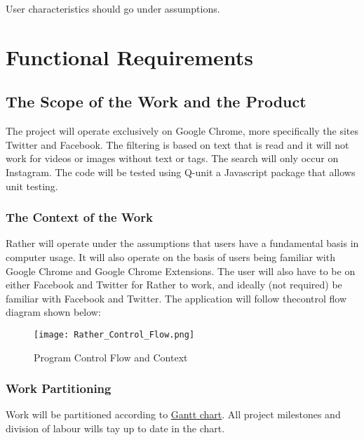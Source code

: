 \documentclass[12pt, titlepage]{article}
\begin{document}
User characteristics should go under assumptions.

\section{Functional Requirements}


\subsection{The Scope of the Work and the Product}
The project will operate exclusively on Google Chrome, more specifically the sites Twitter and Facebook. The filtering is based on text that is read and it will not work for videos or images without text or tags. The search will only occur on Instagram. The code will be tested using Q-unit a Javascript package that allows unit testing.

\subsubsection{The Context of the Work}
Rather will operate under the assumptions that users have a fundamental basis in computer usage. It will also operate on the basis of users being familiar with Google Chrome and Google Chrome Extensions. The user will also have to be on either Facebook and Twitter for Rather to work, and ideally (not required) be familiar with Facebook and Twitter. The application will follow thecontrol flow diagram shown below:
\begin{figure}
  \texttt{[image: Rather\_Control\_Flow.png]}
  \caption{Program Control Flow and Context}
  \label{fig:Control Flow Diagram}
\end{figure}


\subsubsection{Work Partitioning}
Work will be partitioned according to \href{../DevelopmentPlan/Dev_Plan_Rev0.gan}{Gantt chart}. All project milestones and division of labour wills tay up to date in the chart.
\end{document}
